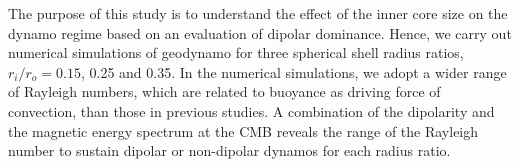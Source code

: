 %
The purpose of this study is to understand the effect of the inner core size on the dynamo regime based on an evaluation of dipolar dominance.
%
Hence, we carry out numerical simulations of geodynamo for three spherical shell radius ratios, 
$r_{i} / r_{o} = 0.15$, 0.25 and 0.35. 
%
In the numerical simulations, we adopt a wider range of Rayleigh numbers, which are related to buoyance as driving force of convection, than those in previous studies.
A combination of the dipolarity and the magnetic energy spectrum at the CMB reveals the range of the Rayleigh number to sustain dipolar or non-dipolar dynamos for each radius ratio.
%